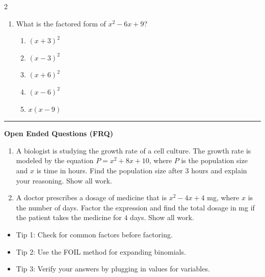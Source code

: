 \documentclass[10pt]{article}
\begin{document}
\begin{multicols}{2}
\begin{enumerate}[label=\textbf{Q\arabic*.}, leftmargin=*, itemsep=6pt, parsep=0pt]
  \item \small What is the factored form of $x^2 - 6x + 9$?
  \begin{enumerate}[label=(\Alph*), leftmargin=0.6cm, nosep, itemsep=2pt]
    \item $(x + 3)^2$
    \item $(x - 3)^2$
    \item $(x + 6)^2$
    \item $(x - 6)^2$
    \item $x(x - 9)$
  \end{enumerate}

\end{enumerate}
\end{multicols}

\vspace{-0.2cm}
\hrule
\vspace{0.2cm}
\textbf{\small Open Ended Questions (FRQ)}
\begin{enumerate}[label=\textbf{Q\arabic*.}, start=9, itemsep=5pt, topsep=0pt]

  \item \small A biologist is studying the growth rate of a cell culture. The growth rate is modeled by the equation $P = x^2 + 8x + 10$, where $P$ is the population size and $x$ is time in hours. Find the population size after $3$ hours and explain your reasoning. Show all work. \vspace{2cm}

  \item \small A doctor prescribes a dosage of medicine that is $x^2 - 4x + 4$ mg, where $x$ is the number of days. Factor the expression and find the total dosage in mg if the patient takes the medicine for $4$ days. Show all work. \vspace{2cm}

\end{enumerate}

\vfill

\begin{tcolorbox}[colback=blue!5, colframe=mainblue!50, title=\small \textbf{Chef's Tips}, fonttitle=\bfseries, bottom=1mm]
\begin{itemize}[noitemsep, topsep=2pt, leftmargin=0.5cm]
  \item \scriptsize Tip 1: Check for common factors before factoring.\item \scriptsize Tip 2: Use the FOIL method for expanding binomials.\item \scriptsize Tip 3: Verify your answers by plugging in values for variables.
\end{itemize}
\end{tcolorbox}
\end{document}
